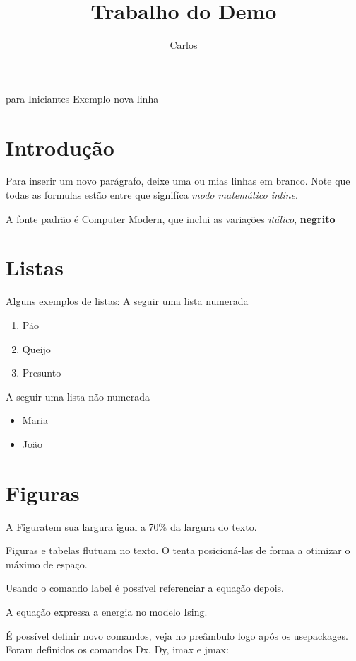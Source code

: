 \documentclass[portuguese,brazilian,12pt,final]{article}
\title{Trabalho do Demo}
\author{Carlos }
\begin{document}
{para Iniciantes Exemplo} nova linha

\section{Introdução}

Para inserir um novo parágrafo, deixe uma ou mias linhas em branco.
Note que todas as formulas estão entre
que signifíca \textit{modo matemático inline}.

A fonte padrão é Computer Modern, que inclui as variações \textit{itálico},
\textbf{negrito}

\section{Listas}

Alguns exemplos de listas: A seguir uma lista numerada

\begin{enumerate}
\item Pão
\item Queijo
\item Presunto
\end{enumerate}

A seguir uma lista não numerada

\begin{itemize}
\item Maria
\item João
\end{itemize}

\section{Figuras}


A Figuratem sua largura igual a 70\% da largura do texto.

Figuras e tabelas flutuam no texto. O tenta posicioná-las de forma a otimizar o máximo de espaço.

Usando o comando label é possível referenciar a equação depois.

A equação expressa a energia no modelo Ising.

É possível definir novo comandos, veja no preâmbulo logo após os usepackages. Foram definidos os comandos Dx, Dy, imax e jmax:
\end{document}
